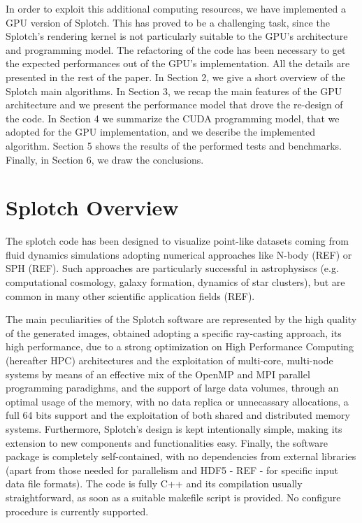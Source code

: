 \documentclass[11pt]{article}
\begin{document}
In order to exploit this additional computing resources, we have implemented 
a GPU version of Splotch. This has proved to be a challenging task, since 
the Splotch's rendering kernel is not particularly suitable to the GPU's architecture
and programming model. The refactoring of the code has been necessary 
to get the expected performances out of the GPU's implementation. 
All the details are presented in the rest of the paper. In Section 2, we give a short 
overview of the Splotch main algorithms. In Section 3, we recap the main features
of the GPU architecture and we present the performance model that drove the 
re-design of the code. In Section 4 we summarize the CUDA programming model, that we
adopted for the GPU implementation, and we describe the implemented algorithm. Section 5 shows
the results of the performed tests and benchmarks. Finally, in Section 6, we draw 
the conclusions. 

\section{Splotch Overview}

The splotch code has been designed to visualize point-like datasets coming
from fluid dynamics simulations adopting numerical approaches like N-body (REF)
or SPH (REF). Such approaches are particularly successful in astrophysiscs (e.g. computational
cosmology, galaxy formation, dynamics of star clusters), but are common in 
many other scientific application fields (REF).

The main peculiarities of the Splotch software are represented by the 
high quality of the generated images, obtained adopting a specific ray-casting 
approach, its high performance, due to a strong optimization on High Performance Computing
(hereafter HPC) architectures and the exploitation of multi-core, multi-node 
systems by means of an effective mix of the OpenMP and MPI parallel programming paradighms, and
the support of large data volumes, through an optimal usage of the memory, with
no data replica or unnecassary allocations, a full 64 bits support and the exploitation
of both shared and distributed memory systems. Furthermore, Splotch's design is kept 
intentionally simple, making its extension to new components and functionalities easy. 
Finally, the software package is completely self-contained, with no dependencies from external 
libraries (apart from those needed for parallelism and HDF5 - REF - for
specific input data file formats). The code is fully C++ and its compilation
usually straightforward, as soon as a suitable makefile script is provided.
No configure procedure is currently supported.
\end{document}
